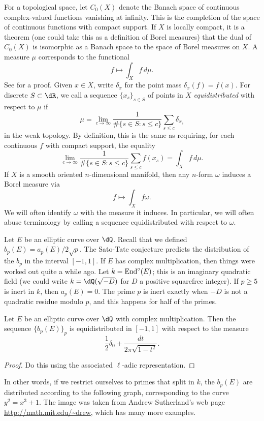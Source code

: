 For a topological space, let $C_0(X)$ denote the Banach space of continuous 
complex-valued functions vanishing at infinity. This is the completion of the 
space of continuous functions with compact support. If $X$ is locally compact, 
it is a theorem (one could take this as a definition of Borel measures) that 
the dual of $C_0(X)$ is isomorphic as a Banach space to the space of Borel 
measures on $X$. A measure $\mu$ corresponds to the functional 
\[
  f\mapsto  \int_X f\, d\mu \text{.}
\]
See \cite[6.19]{ru87} for a proof. Given $x\in X$, write $\delta_x$ for the 
point mass $\delta_x(f) = f(x)$. For discrete $S\subset \dR$, we call a 
sequence $\{x_s\}_{s\in S}$ of points in $X$ \emph{equidistributed} with 
respect to $\mu$ if 
\[
  \mu = \lim_{c \to \infty} \frac{1}{\# \{s\in S:s\leqslant c\}} \sum_{s\leqslant c} \delta_{x_s} 
\]
in the weak topology. By definition, this is the same as requiring, for each 
continuous $f$ with compact support, the equality 
\[
   \lim_{c \to \infty} \frac{1}{\# \{s\in S:s\leqslant c\}} \sum_{s\leqslant c} f(x_s)  = \int_X f\, d\mu\text{.}
\]
If $X$ is a smooth oriented $n$-dimensional manifold, then any $n$-form 
$\omega$ induces a Borel measure via 
\[
  f\mapsto \int_X f\omega \text{.}
\]
We will often identify $\omega$ with the measure it induces. In particular, we 
will often abuse terminology by calling a sequence equidistributed with 
respect to $\omega$. 

Let $E$ be an elliptic curve over $\dQ$. Recall that we defined 
$b_p(E) = a_p(E) / 2\sqrt p$. The Sato-Tate conjecture predicts the 
distribution of the $b_p$ in the interval $[-1,1]$. If $E$ has complex 
multiplication, then things were worked out quite a while ago. Let 
$k=\operatorname{End}^\circ(E)$; this is an imaginary quadratic field (we could write 
$k=\dQ(\sqrt{-D})$ for $D$ a positive squarefree integer). If 
$p\geqslant 5$ is inert in $k$, then $a_p(E) = 0$. The prime $p$ is inert 
exactly when $-D$ is not a quadratic residue modulo $p$, and this happens 
for half of the primes. 

\begin{theorem}\label{thm:deuring-hecke}
Let $E$ be an elliptic curve over $\dQ$ with complex multiplication. Then the 
sequence $\{b_p(E)\}_p$ is equidistributed in $[-1,1]$ with respect to 
the  measure 
\[
  \frac 1 2 \delta_0 + \frac{dt}{2\pi \sqrt{1-t^2}} \text{.}
\]
\end{theorem}
\begin{proof}
Do this using the associated $\ell$-adic representation. 
\end{proof}
In other words, if we restrict ourselves to primes that split in $k$, the 
$b_p(E)$ are distributed according to the following graph, corresponding 
to the curve $y^2=x^3+1$. The image was taken from Andrew Sutherland's 
web page \url{http://math.mit.edu/~drew}, which has many more examples. 

